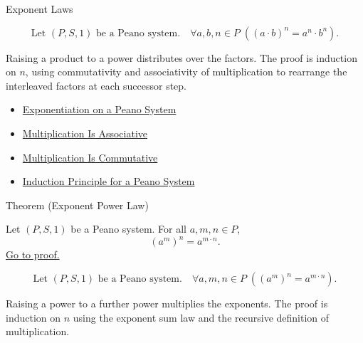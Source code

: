 \begin{topicbox}{Exponent Laws}
\begin{remark*}
\[
\text{Let } (P,S,1) \text{ be a Peano system.}\quad
\forall a,b,n \in P\;((a \cdot b)^n = a^n \cdot b^n).
\]
\end{remark*}

\begin{remark*}[Interpretation]
Raising a product to a power distributes over the factors. The proof is
induction on $n$, using commutativity and associativity of multiplication to
rearrange the interleaved factors at each successor step.
\end{remark*}

\begin{dependencies}
\begin{itemize}
  \item \hyperref[def:exponentiation-on-peano-system]{Exponentiation on a Peano System}
  \item \hyperref[thm:multiplication-associative]{Multiplication Is Associative}
  \item \hyperref[thm:multiplication-commutative]{Multiplication Is Commutative}
  \item \hyperref[thm:induction-principle-for-peano-system]{Induction Principle for a Peano System}
\end{itemize}
\end{dependencies}

\begin{theorembox}{Theorem (Exponent Power Law)}
\begin{theorem}
\label{thm:exponent-power-law}
Let $(P,S,1)$ be a Peano system. For all $a,m,n \in P$,
\[
(a^m)^n = a^{m \cdot n}.
\]
\hyperref[prf:exponent-power-law]{Go to proof.}
\end{theorem}
\end{theorembox}

\begin{remark*}
\[
\text{Let } (P,S,1) \text{ be a Peano system.}\quad
\forall a,m,n \in P\;((a^m)^n = a^{m \cdot n}).
\]
\end{remark*}

\begin{remark*}[Interpretation]
Raising a power to a further power multiplies the exponents. The proof is
induction on $n$ using the exponent sum law and the recursive definition of
multiplication.
\end{remark*}


\end{topicbox}
